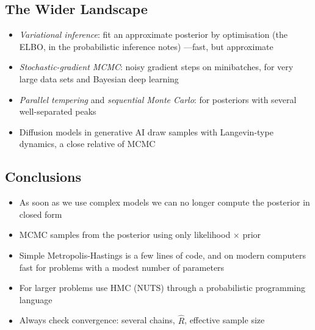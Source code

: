 \begin{slide}
\section{The Wider Landscape}

\begin{PauseHighLight}
  \begin{itemize}
  \item \emph{Variational inference}: fit an approximate posterior by
    optimisation (the ELBO, in the probabilistic inference notes)
    ---fast, but approximate\pause
  \item \emph{Stochastic-gradient MCMC}: noisy gradient steps on
    minibatches, for very large data sets and Bayesian deep
    learning\pause
  \item \emph{Parallel tempering} and \emph{sequential Monte Carlo}: for
    posteriors with several well-separated peaks\pause
  \item Diffusion models in generative AI draw samples with
    Langevin-type dynamics, a close relative of MCMC\pause
  \end{itemize}
\end{PauseHighLight}

\end{slide}


\begin{slide}
\section{Conclusions}

\begin{PauseHighLight}
  \begin{itemize}
  \item As soon as we use complex models we can no longer compute the
    posterior in closed form\pause
  \item MCMC samples from the posterior using only likelihood
    $\times$ prior\pause
  \item Simple Metropolis-Hastings is a few lines of code, and on modern
    computers fast for problems with a modest number of
    parameters\pause
  \item For larger problems use HMC (NUTS) through a probabilistic
    programming language\pause
  \item Always check convergence: several chains, $\hat{R}$, effective
    sample size\pause
  \end{itemize}
\end{PauseHighLight}

\end{slide}




